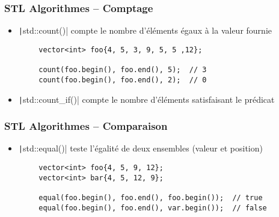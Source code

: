 \documentclass[C++.tex]{subfiles}
\begin{document}
\begin{frame}[fragile]
	\frametitle{STL Algorithmes -- Comptage}
	\begin{itemize}
		\item \texttt|std::count()| compte le nombre d'éléments égaux à la valeur fournie
	\end{itemize}

	\begin{verbatim}
		vector<int> foo{4, 5, 3, 9, 5, 5 ,12};

		count(foo.begin(), foo.end(), 5);  // 3
		count(foo.begin(), foo.end(), 2);  // 0
	\end{verbatim}

	\begin{itemize}
		\item \texttt|std::count_if()| compte le nombre d'éléments satisfaisant le prédicat
	\end{itemize}

\end{frame}

\begin{frame}[fragile]
	\frametitle{STL Algorithmes -- Comparaison}
	\begin{itemize}
		\item \texttt|std::equal()| teste l'égalité de deux ensembles (valeur et position)
	\end{itemize}

	\begin{verbatim}
		vector<int> foo{4, 5, 9, 12};
		vector<int> bar{4, 5, 12, 9};

		equal(foo.begin(), foo.end(), foo.begin());  // true
		equal(foo.begin(), foo.end(), var.begin());  // false
	\end{verbatim}
\end{frame}
\end{document}
